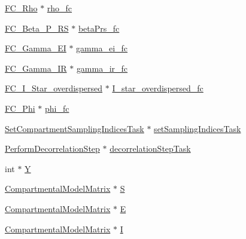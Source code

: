 \begin{DoxyCompactItemize}
\hyperlink{classSpatialSEIR_1_1FC__Rho}{F\-C\-\_\-\-Rho} $\ast$ \hyperlink{classSpatialSEIR_1_1ModelContext_a894f23aa95ff98664b2cf71443cde6e5}{rho\-\_\-fc}
\item 
\hyperlink{classSpatialSEIR_1_1FC__Beta__P__RS}{F\-C\-\_\-\-Beta\-\_\-\-P\-\_\-\-R\-S} $\ast$ \hyperlink{classSpatialSEIR_1_1ModelContext_a9eb52c439f5b00fe5926297f45484bd3}{beta\-Prs\-\_\-fc}
\item 
\hyperlink{classSpatialSEIR_1_1FC__Gamma__EI}{F\-C\-\_\-\-Gamma\-\_\-\-E\-I} $\ast$ \hyperlink{classSpatialSEIR_1_1ModelContext_a6973164c7a807aea76f3bab1f4403cd5}{gamma\-\_\-ei\-\_\-fc}
\item 
\hyperlink{classSpatialSEIR_1_1FC__Gamma__IR}{F\-C\-\_\-\-Gamma\-\_\-\-I\-R} $\ast$ \hyperlink{classSpatialSEIR_1_1ModelContext_a9293a2cef5007f0f4510072fb3babbf1}{gamma\-\_\-ir\-\_\-fc}
\item 
\hyperlink{classSpatialSEIR_1_1FC__I__Star__overdispersed}{F\-C\-\_\-\-I\-\_\-\-Star\-\_\-overdispersed} $\ast$ \hyperlink{classSpatialSEIR_1_1ModelContext_a7c02046540bcf230845d6d6821148d67}{I\-\_\-star\-\_\-overdispersed\-\_\-fc}
\item 
\hyperlink{classSpatialSEIR_1_1FC__Phi}{F\-C\-\_\-\-Phi} $\ast$ \hyperlink{classSpatialSEIR_1_1ModelContext_a97d54a9e4778575b5c88264f88831fc4}{phi\-\_\-fc}
\item 
\hyperlink{classSpatialSEIR_1_1SetCompartmentSamplingIndicesTask}{Set\-Compartment\-Sampling\-Indices\-Task} $\ast$ \hyperlink{classSpatialSEIR_1_1ModelContext_abc04b849ec0d819b9a4893862348a606}{set\-Sampling\-Indices\-Task}
\item 
\hyperlink{classSpatialSEIR_1_1PerformDecorrelationStep}{Perform\-Decorrelation\-Step} $\ast$ \hyperlink{classSpatialSEIR_1_1ModelContext_a0b5cd5089cd6b9ebf3034387406dccb2}{decorrelation\-Step\-Task}
\item 
int $\ast$ \hyperlink{classSpatialSEIR_1_1ModelContext_a21143ccd9b787ff4a42c83cdb2b81a80}{Y}
\item 
\hyperlink{classSpatialSEIR_1_1CompartmentalModelMatrix}{Compartmental\-Model\-Matrix} $\ast$ \hyperlink{classSpatialSEIR_1_1ModelContext_afa683f7f79821d957107d301dfe392c1}{S}
\item 
\hyperlink{classSpatialSEIR_1_1CompartmentalModelMatrix}{Compartmental\-Model\-Matrix} $\ast$ \hyperlink{classSpatialSEIR_1_1ModelContext_ad5128cd85f8a1005b11a97c6ff7894e1}{E}
\item 
\hyperlink{classSpatialSEIR_1_1CompartmentalModelMatrix}{Compartmental\-Model\-Matrix} $\ast$ \hyperlink{classSpatialSEIR_1_1ModelContext_aa68b54ddf89a3ea432433dfb09c7983f}{I}

\end{DoxyCompactItemize}
